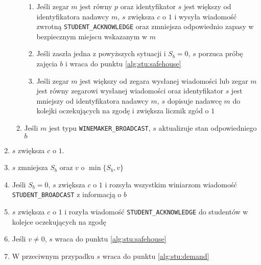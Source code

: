\documentclass[12pt, a4paper, oneside]{article}
\begin{document}
\begin{enumerate}
\begin{enumerate}
\begin{enumerate}
                \item Jeśli zegar $ m $ jest równy $ p $ oraz identyfikator $ s $ jest większy od identyfikatora nadawcy $ m $, $ s $ zwiększa $ c $ o $ 1 $ i wysyła wiadomość zwrotną \texttt{STUDENT\_ACKNOWLEDGE} oraz zmniejsza odpowiednio zapasy w bezpiecznym miejscu wskazanym w $ m $
                \item Jeśli zaszła jedna z powyższych sytuacji i $ \mathit{S}_b = 0 $, $ s $ porzuca próbę zajęcia $ b $ i wraca do punktu \ref{alg:stu:safehouse}
                \item Jeśli zegar $ m $ jest większy od zegara wysłanej wiadomości lub zegar $ m $ jest równy zegarowi wysłanej wiadomości oraz identyfikator $ s $ jest mniejszy od identyfikatora nadawcy $ m $, $ s $ dopisuje nadawcę $ m $ do kolejki oczekujących na zgodę i zwiększa licznik zgód o $ 1 $
            \end{enumerate}
        \item Jeśli $ m $ jest typu \texttt{WINEMAKER\_BROADCAST}, $ s $ aktualizuje stan odpowiedniego $ b $
        \end{enumerate}
    \item $ s $ zwiększa $ c $ o $ 1 $.
    \item $ s $ zmniejsza $ \mathit{S}_b $ oraz $ v $ o $ \min\{\mathit{S}_b, v\} $
    \item Jeśli $ \mathit{S}_b = 0 $, $ s $ zwiększa $ c $ o $ 1 $ i rozsyła wszystkim winiarzom wiadomość \texttt{STUDENT\_BROADCAST} z informacją o $ b $
    \item $ s $ zwiększa $ c $ o $ 1 $ i rozyła wiadomość \texttt{STUDENT\_ACKNOWLEDGE} do studentów w kolejce oczekujących na zgodę
    \item Jeśli $ v \neq 0 $, $ s $ wraca do punktu \ref{alg:stu:safehouse}
    \item W przeciwnym przypadku $ s $ wraca do punktu \ref{alg:stu:demand}
\end{enumerate}
\end{document}
